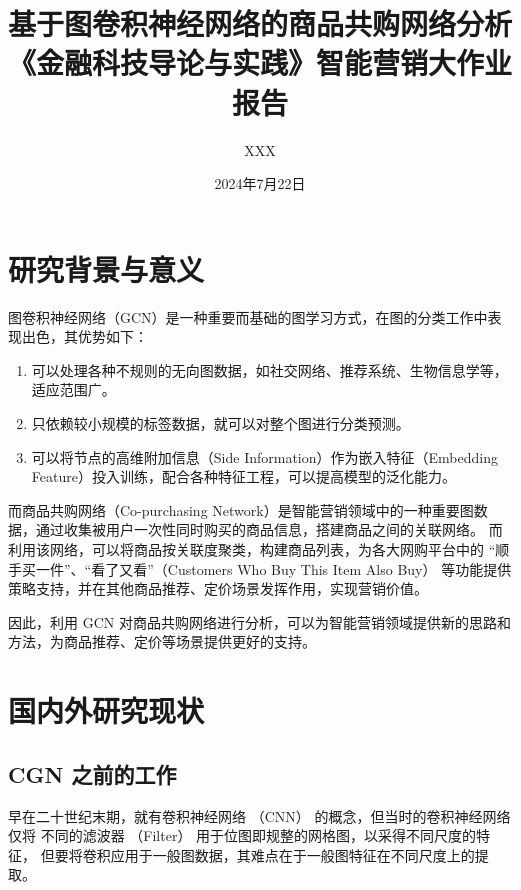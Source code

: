 \documentclass[12pt]{ctexart} %
\title{
\CJKfontspec{SimHei}\Huge\bfseries 基于图卷积神经网络的商品共购网络分析 \\
\Large 《金融科技导论与实践》智能营销大作业报告
}
\author{XXX}
\date{2024年7月22日}
\begin{document}
\fancyfoot[C]{\thepage}


\setlength{\extrarowheight}{2pt}  %

\maketitle
\renewcommand{\cftsecleader}{\cftdotfill{\cftdotsep}}
\tableofcontents
\newpage


\section{研究背景与意义}

图卷积神经网络（GCN）是一种重要而基础的图学习方式，在图的分类工作中表现出色\cite{kipf2017semi}，其优势如下：

\begin{enumerate}
    \item 可以处理各种不规则的无向图数据，如社交网络、推荐系统、生物信息学等，适应范围广。
    \item 只依赖较小规模的标签数据，就可以对整个图进行分类预测。
    \item 可以将节点的高维附加信息（Side Information）作为嵌入特征（Embedding Feature）投入训练，配合各种特征工程，可以提高模型的泛化能力。
\end{enumerate}


而商品共购网络（Co-purchasing Network）是智能营销领域中的一种重要图数据，通过收集被用户一次性同时购买的商品信息，搭建商品之间的关联网络。
而利用该网络，可以将商品按关联度聚类，构建商品列表，为各大网购平台中的 “顺手买一件”、“看了又看”（Customers Who Buy This Item Also Buy） 等功能提供策略支持，并在其他商品推荐、定价场景发挥作用，实现营销价值。

因此，利用 GCN 对商品共购网络进行分析，可以为智能营销领域提供新的思路和方法，为商品推荐、定价等场景提供更好的支持。

\section{国内外研究现状}

\subsection{ CGN 之前的工作}

早在二十世纪末期，就有卷积神经网络 （CNN） 的概念，但当时的卷积神经网络仅将 不同的滤波器 （Filter） 用于位图即规整的网格图，以采得不同尺度的特征，
但要将卷积应用于一般图数据，其难点在于一般图特征在不同尺度上的提取。
\end{document}
